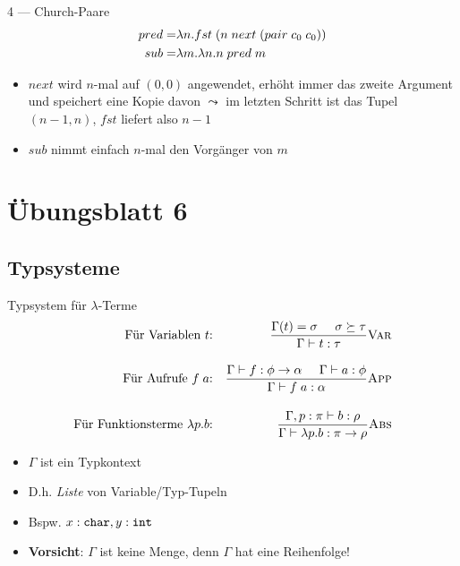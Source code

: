 \documentclass{beamer}
\begin{document}
\begin{frame}{4 --- Church-Paare}
	\begin{eqnarray*}
		pred =& \lambda{}n.fst\;{}(n\;{}next\;{}(pair\;{}c_0\;{}c_0)) \\
		sub =& \lambda{}m.\lambda{}n.n\;{}pred\;{}m
	\end{eqnarray*}

	\begin{itemize}
		\item $next$ wird $n$-mal auf $(0, 0)$ angewendet, erhöht immer das zweite Argument und speichert eine Kopie davon $\leadsto$ im letzten Schritt ist das Tupel $(n - 1, n)$, $fst$ liefert also $n - 1$
		\item $sub$ nimmt einfach $n$-mal den Vorgänger von $m$
	\end{itemize}
\end{frame}

\section{Übungsblatt 6}

\subsection{Typsysteme}

\begin{frame}{Typsystem für $\lambda$-Terme}
	\begin{align*}
		\textrm{Für Variablen $t$:} && \frac{\Gamma{}(t) = \sigma \;\;\;\;\; \sigma \succeq \tau}{\Gamma \vdash t : \tau} \textrm{\textsc{Var}} \\[1em]
		\textrm{Für Aufrufe $f\;{}a$:} && \frac{\Gamma \vdash f : \phi \to \alpha \;\;\;\;\; \Gamma \vdash a : \phi}{\Gamma \vdash f\;{}a : \alpha} \textrm{\textsc{App}} \\[1em]
		\textrm{Für Funktionsterme $\lambda{}p.b$:} && \frac{\Gamma, p : \pi \vdash b : \rho}{\Gamma \vdash \lambda{}p.b : \pi \to \rho} \textrm{\textsc{Abs}}
	\end{align*}

	\begin{itemize}
		\item $\Gamma$ ist ein Typkontext
		\item D.h. \emph{Liste} von Variable/Typ-Tupeln
		\item Bspw. $x : \textrm{\texttt{char}}, y : \textrm{\texttt{int}}$
		\item \textbf{Vorsicht}: $\Gamma$ ist keine Menge, denn $\Gamma$ hat eine Reihenfolge!
	\end{itemize}
\end{frame}
\end{document}
